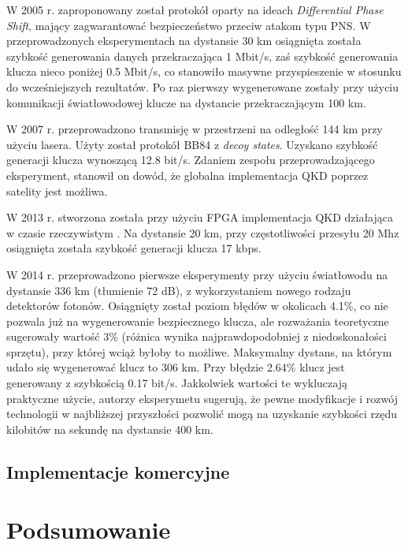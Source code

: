 \documentclass[10pt]{article}
\begin{document}
W 2005 r. zaproponowany został protokół oparty na ideach \emph{Differential Phase Shift}, mający
zagwarantować bezpieczeństwo przeciw atakom typu PNS\cite{Takesue05}. W przeprowadzonych eksperymentach
na dystansie 30 km osiągnięta została szybkość generowania danych przekraczająca 1 Mbit/s, zaś szybkość
generowania klucza nieco poniżej 0.5 Mbit/s, co stanowiło masywne przyspieszenie w stosunku do 
wcześniejszych rezultatów. Po raz pierwszy wygenerowane zostały przy użyciu komunikacji światłowodowej
klucze na dystancie przekraczającym 100 km.

W 2007 r. przeprowadzono transmisję w przestrzeni na odległość 144 km przy użyciu lasera. Użyty
został protokół BB84 z \emph{decoy states}. Uzyskano szybkość generacji klucza wynoszącą 12.8 bit/s.
Zdaniem zespołu przeprowadzającego eksperyment, stanowił on dowód, że globalna implementacja QKD
poprzez satelity jest możliwa.

W 2013 r. stworzona została przy użyciu FPGA implementacja QKD działająca w czasie rzeczywistym
\cite{Zhang13}. Na dystansie 20 km, przy częstotliwości przesyłu 20 Mhz osiągnięta została szybkość
generacji klucza 17 kbps.

W 2014 r. przeprowadzono pierwsze eksperymenty przy użyciu światłowodu na dystansie 336 km (tłumienie
72 dB), z wykorzystaniem nowego rodzaju detektorów fotonów\cite{Shibata14}. Osiągnięty został poziom 
błędów w okolicach 4.1\%, co nie pozwala już na wygenerowanie bezpiecznego klucza, ale rozważania
teoretyczne sugerowały wartość 3\% (różnica wynika najprawdopodobniej z niedoskonałości sprzętu), 
przy której wciąż byłoby to możliwe. Maksymalny dystans, na którym udało się wygenerować klucz to 
306 km. Przy błędzie 2.64\% klucz jest generowany z szybkością 0.17 bit/s. Jakkolwiek wartości te 
wykluczają praktyczne użycie, autorzy eksperymetu sugerują, że pewne modyfikacje i rozwój technologii 
w najbliższej przyszłości pozwolić mogą na uzyskanie szybkości rzędu kilobitów na sekundę na dystansie 
400 km.

\subsection{Implementacje komercyjne}


\section{Podsumowanie}

\nocite{*}



\end{document}
